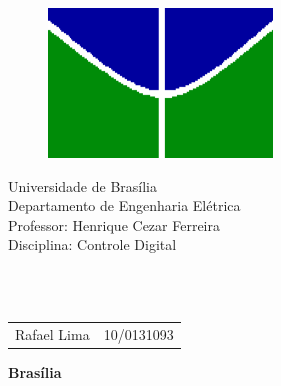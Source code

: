 \begin{figure}[h!]
\centering
\includegraphics[scale=0.9]{img/simb_unb.png}
\label{fig:unb}
\end{figure}

\begin{center}
{\LARGE Universidade de Brasília}\\
Departamento de Engenharia Elétrica\\
Professor: Henrique Cezar Ferreira\\
Disciplina: Controle Digital\\
\end{center}


\vspace{0.18\textheight}

\begin{center}
    \Huge \textbf{\\\thetitle \\}
\end{center}

\vspace*{\fill} %


\begin{table}[H]
    \begin{tabular}{ll}
        Rafael Lima & 10/0131093 \\
    \end{tabular}
\end{table}

\vspace{0.5cm}

\begin{center}
    \textbf{Brasília\\
    \the\year} %
\end{center}

\thispagestyle{empty} %

\newpage
\tableofcontents
\newpage


